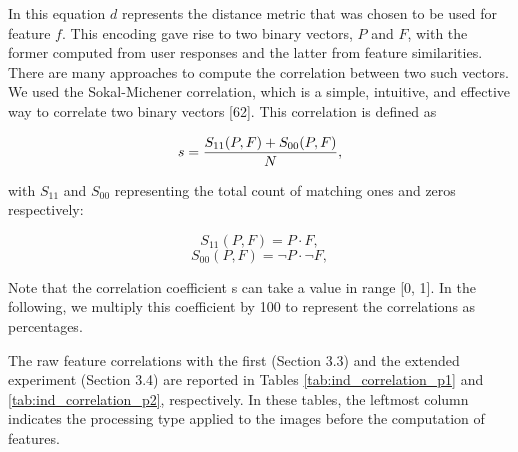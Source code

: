 In this equation $d$ represents the distance metric that was chosen to be used for feature $f$. This encoding gave rise to two binary vectors, $P$ and $F$, with the former computed from user responses and the latter from feature similarities. There are many approaches to compute the correlation between two such vectors. We used the Sokal-Michener correlation, which is a simple, intuitive, and effective way to correlate two binary vectors [62]. This correlation is defined as

\begin{equation}
s = {{S_{11}(P, F) + S_{00}(P, F)} \over {N}},
\end{equation}

with $S_{11}$ and $S_00$ representing the total count of matching ones and zeros respectively:

\begin{equation}
    S_{11}(P, F) = P \cdot F,
\end{equation}
\begin{equation}
    S_{00}(P, F) = \neg P \cdot \neg F, 
\end{equation}


Note that the correlation coefficient s can take a value in range [0, 1]. In the following, we multiply this coefficient by 100 to represent the correlations as percentages.

The raw feature correlations with the first (Section 3.3) and the extended experiment (Section 3.4) are reported in Tables \ref{tab:ind_correlation_p1} and \ref{tab:ind_correlation_p2}, respectively. In these tables, the leftmost column indicates the processing type applied to the images before the computation of features.


